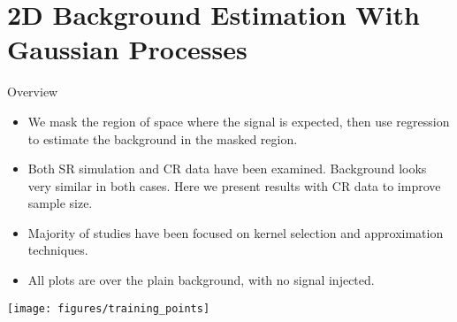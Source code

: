 \documentclass[10pt]{beamer}
\begin{document}

\section[Regression Results]{2D Background Estimation With Gaussian Processes}
\label{sec:2d-gauss-proc}

\begin{frame}{Overview}
  \begin{itemize}
  \item We mask the region of space where the signal is expected, then use regression to estimate the background in the masked region.
  \item Both SR simulation and CR data have been examined. Background looks very similar in both cases. Here we present results with CR data to improve sample size. 
  \item Majority of studies have been focused on kernel selection and approximation techniques.
  \item All plots are over the plain background, with no signal injected.
  \end{itemize}
  \begin{center}
    \texttt{[image: figures/training\_points]}
  \end{center}
\end{frame}
\end{document}
